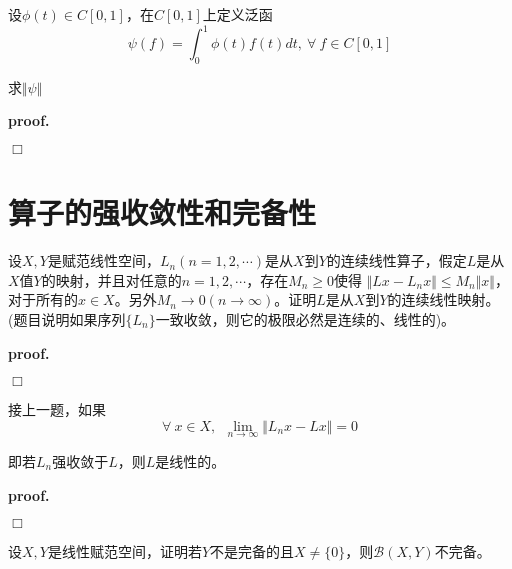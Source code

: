 \begin{mdframed}
    \begin{question}
        设$\phi(t)\in C[0,1]$，在$C[0,1]$上定义泛函
        \begin{equation}
            \psi(f)=\int_{0}^{1}\phi(t)f(t)dt,\ \forall\ f\in C[0,1]
        \end{equation}

        求$\Vert \psi\Vert$
    \end{question}
\end{mdframed}

\textbf{proof.}

$\Box$

\section{算子的强收敛性和完备性}

\begin{mdframed}
    \begin{question}
        设$X,Y$是赋范线性空间，$L_n(n=1,2,\cdots)$是从$X$到$Y$的连续线性算子，假定$L$是从$X$值$Y$的映射，并且对任意的$n=1,2,\cdots$，存在$M_n\geqslant 0$使得
        $\Vert Lx-L_nx\Vert\leqslant M_n\Vert x\Vert$，对于所有的$x\in X$。另外$M_n\rightarrow 0(n\rightarrow \infty)$。证明$L$是从$X$到$Y$的连续线性映射。(题目说明如果序列$\{L_n\}$一致收敛，则它的极限必然是连续的、线性的)。
    \end{question}
\end{mdframed}

\textbf{proof.}

$\Box$

\begin{mdframed}
    \begin{question}
        接上一题，如果
        \begin{equation}
            \forall\ x\in X,\ \ \lim_{n\rightarrow \infty}\Vert L_nx-Lx\Vert =0
        \end{equation}

        即若$L_n$强收敛于$L$，则$L$是线性的。
    \end{question}
\end{mdframed}

\textbf{proof.}

$\Box$

\begin{mdframed}
    \begin{question}
        设$X,Y$是线性赋范空间，证明若$Y$不是完备的且$X\neq \{0\}$，则$\mathcal{B}(X,Y)$不完备。
    \end{question}
\end{mdframed}

